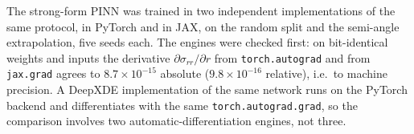\documentclass[subscriptcorrection,upint,varvw,barcolor=Goldenrod3,mathalfa=cal=euler,balance,hyphenate,french,pdf-a]{asmejour} %
\begin{document}
The strong-form PINN was trained in two independent implementations of the same protocol, in PyTorch and in JAX, on the random split and the semi-angle extrapolation, five seeds each. The engines were checked first: on bit-identical weights and inputs the derivative $\partial\sigma_{rr}/\partial r$ from \texttt{torch.autograd} and from \texttt{jax.grad} agrees to $8.7\times10^{-15}$ absolute ($9.8\times10^{-16}$ relative), i.e.\ to machine precision. A DeepXDE implementation \citep{lu2021} of the same network runs on the PyTorch backend and differentiates with the same \texttt{torch.autograd.grad}, so the comparison involves two automatic-differentiation engines, not three.
\end{document}

